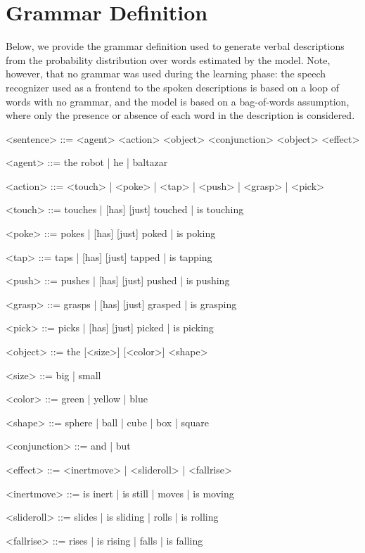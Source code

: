 \section{Grammar Definition}
\label{appendix:grammar}
Below, we provide the grammar definition used to generate verbal descriptions from the probability distribution over words estimated by the model.
Note, however, that no grammar was used during the learning phase: the speech recognizer used as a frontend to the spoken descriptions is based on a loop of words with no grammar, and the \AffWords{} model is based on a bag-of-words assumption, where only the presence or absence of each word in the description is considered.


\begin{grammar}
  <sentence> ::= <agent> <action> <object> <conjunction> <object> <effect>

  <agent> ::= the robot | he | baltazar 

  <action> ::= <touch> | <poke> | <tap> | <push> | <grasp> | <pick>

  <touch> ::= touches | [has] [just] touched | is touching

  <poke> ::= pokes | [has] [just] poked | is poking

  <tap> ::= taps | [has] [just] tapped | is tapping

  <push> ::= pushes | [has] [just] pushed | is pushing

  <grasp> ::= grasps | [has] [just] grasped | is grasping

  <pick> ::= picks | [has] [just] picked | is picking

  <object> ::= the [<size>] [<color>] <shape>

  <size> ::= big | small
  
  <color> ::= green | yellow | blue
  
  <shape> ::= sphere | ball | cube | box | square

  <conjunction> ::= and | but

  <effect> ::= <inertmove> | <slideroll> | <fallrise>

  <inertmove> ::= is inert | is still | moves | is moving

  <slideroll> ::= slides | is sliding | rolls | is rolling

  <fallrise> ::= rises | is rising | falls | is falling
\end{grammar}

